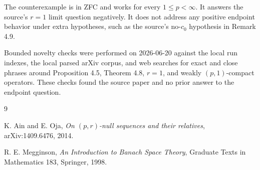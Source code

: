 \documentclass[11pt]{article}
\begin{document}
The counterexample is in ZFC and works for every $1\le p<\infty$.
It answers the source's $r=1$ limit question negatively.  It does not
address any positive endpoint behavior under extra hypotheses, such as
the source's no-$c_0$ hypothesis in Remark 4.9.

Bounded novelty checks were performed on 2026-06-20 against the local
run indexes, the local parsed arXiv corpus, and web searches for exact
and close phrases around Proposition 4.5, Theorem 4.8, $r=1$, and
weakly $(p,1)$-compact operators.  These checks found the source paper
and no prior answer to the endpoint question.

\begin{thebibliography}{9}

K. Ain and E. Oja,
\emph{On $(p,r)$-null sequences and their relatives},
arXiv:1409.6476, 2014.

R. E. Megginson,
\emph{An Introduction to Banach Space Theory},
Graduate Texts in Mathematics 183, Springer, 1998.

\end{thebibliography}
\end{document}
